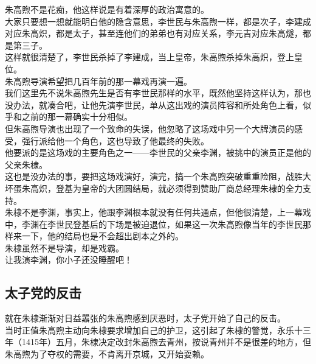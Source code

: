 \begin{multicols}{\theparacolNo}
朱高煦不是花痴，他这样说是有着深厚的政治寓意的。\\

大家只要想一想就能明白他的隐含意思，李世民与朱高煦一样，都是次子，李建成对应朱高炽，都是太子，甚至连他们的弟弟也有对应关系，李元吉对应朱高燧，都是第三子。\\

这样就很清楚了，李世民杀掉了李建成，当上皇帝，朱高煦杀掉朱高炽，登上皇位。\\

朱高煦导演希望把几百年前的那一幕戏再演一遍。\\

我们这里先不说朱高煦先生是否有李世民那样的水平，既然他坚持这样认为，那也没办法，就凑合吧，让他先演李世民，单从这出戏的演员阵容和所处角色上看，似乎和之前的那一幕确实十分相似。\\

但朱高煦导演也出现了一个致命的失误，他忽略了这场戏中另一个大牌演员的感受，强行派给他一个角色，这也导致了他最终的失败。\\

他要派的是这场戏的主要角色之一——李世民的父亲李渊，被挑中的演员正是他的父亲朱棣。\\

这也是没办法的事，要把这场戏演好，演完，搞一个朱高煦突破重重险阻，战胜大坏蛋朱高炽，登基为皇帝的大团圆结局，就必须得到赞助厂商总经理朱棣的全力支持。\\

朱棣不是李渊，事实上，他跟李渊根本就没有任何共通点，但他很清楚，上一幕戏中，李渊在李世民登基后的下场是被迫退位，如果这一次朱高煦像当年的李世民那样来一下，他的结局也是不会超出剧本之外的。\\

朱棣虽然不是导演，却是戏霸。\\

让我演李渊，你小子还没睡醒吧！\\

\subsection{太子党的反击}
就在朱棣渐渐对日益嚣张的朱高煦感到厌恶时，太子党开始了自己的反击。\\

当时正值朱高煦主动向朱棣要求增加自己的护卫，这引起了朱棣的警觉，永乐十三年（1415年）五月，朱棣决定改封朱高煦去青州，按说青州并不是很差的地方，但朱高煦为了夺权的需要，不肯离开京城，又开始耍赖。\\


\end{multicols}

